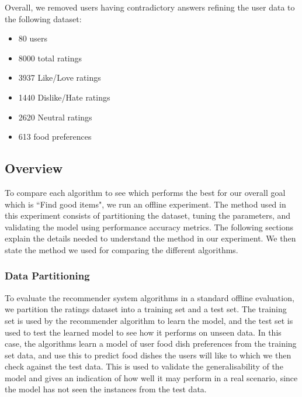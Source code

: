Overall, we removed users having contradictory answers refining the user data to the following dataset:
\begin{itemize}
	\item{80 users}
	\item{8000 total ratings}
	\item{3937 Like/Love ratings}
	\item{1440 Dislike/Hate ratings}
    \item{2620 Neutral ratings}
	\item{613 food preferences}
\end{itemize}

\subsection{Overview}

To compare each algorithm to see which performs the best for our overall goal which is ``Find good items", we run an offline experiment. The method used in this experiment consists of partitioning the dataset, tuning the parameters, and validating the model using performance accuracy metrics. The following sections explain the details needed to understand the method in our experiment. We then state the method we used for comparing the different algorithms. 

\subsubsection{Data Partitioning}

To evaluate the recommender system algorithms in a standard offline evaluation, we partition the ratings dataset into a training set and a test set. The training set is used by the recommender algorithm to learn the model, and the test set is used to test the learned model to see how it performs on unseen data. In this case, the algorithms learn a model of user food dish preferences from the training set data, and use this to predict food dishes the users will like to which we then check against the test data. This is used to validate the generalisability of the model and gives an indication of how well it may perform in a real scenario, since the model has not seen the instances from the test data.

